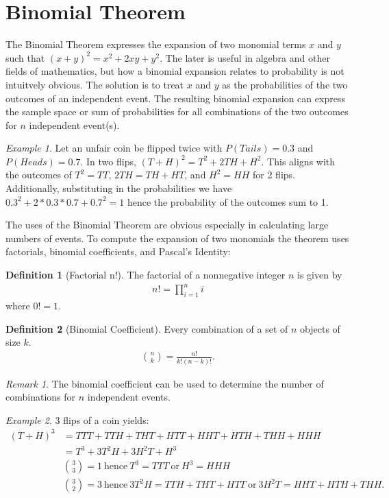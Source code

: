 \documentclass{article}
\theoremstyle{plain}
\theoremstyle{definition}
\newtheorem{definition}{Definition}
\theoremstyle{remark}
\newtheorem{remark}{Remark}
\newtheorem{example}{Example}
\begin{document}
\section{Binomial Theorem}
The Binomial Theorem expresses the expansion of two monomial terms $x$ and $y$ such that $(x + y)^2 = x^2 + 2xy + y^2$. The later is useful in algebra and other fields of mathematics, but how a binomial expansion relates to probability is not intuitvely obvious. The solution is to treat $x$ and $y$ as the probabilities of the two outcomes of an independent event. The resulting binomial expansion can express the sample space or sum of probabilities for all combinations of the two outcomes for $n$ independent event(s).
\begin{example}
  Let an unfair coin be flipped twice with $P(Tails) = 0.3$ and $P(Heads) = 0.7$. In two flips, $(T + H)^2 = T^2 + 2TH + H^2$. This aligns with the outcomes of $T^2 = TT$, $2TH = TH + HT$, and $H^2 = HH$ for 2 flips. Additionally, substituting in the probabilities we have $0.3^2 + 2*0.3*0.7 + 0.7^2 = 1$ hence the probability of the outcomes sum to 1.
\end{example}
The uses of the Binomial Theorem are obvious especially in calculating large numbers of events. To compute the expansion of two monomials the theorem uses factorials, binomial coefficients, and Pascal's Identity:
\begin{definition}[Factorial n!]
  The factorial of a nonnegative integer $n$ is given by
  \begin{align*}
    n! = {\displaystyle\prod_{i=1}^{n}i}
  \end{align*}
  where $0! = 1$.
\end{definition}
\begin{definition}[Binomial Coefficient]
  Every combination of a set of $n$ objects of size $k$.
  \begin{align*}
    \binom{n}{k} = \frac{n!}{k!(n-k)!}.
  \end{align*}
\end{definition}
\begin{remark}
  The binomial coefficient can be used to determine the number of combinations for $n$ independent events.
 \end{remark}
\begin{example}
  3 flips of a coin yields:
  \begin{align*}
  (T + H)^3 &= TTT + TTH + THT + HTT + HHT+ HTH + THH + HHH \\
  &= T^3 + 3T^2H + 3H^2T + H^3 \\
  &\binom{3}{3} = 1\ \text{hence}\ T^3 = TTT\ \text{or}\ H^3 = HHH \\
  &\binom{3}{2} = 3\ \text{hence}\ 3T^2H = TTH + THT + HTT\ \text{or}\ 3H^2T = HHT+HTH+THH. \\
  \end{align*}
\end{example}
\end{document}
